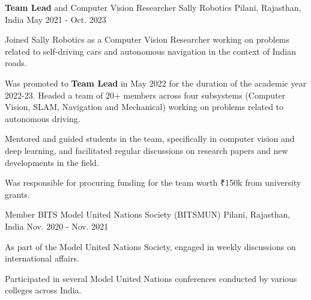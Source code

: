 

\begin{cventries}

  \cventry
    {\textbf{Team Lead} and Computer Vision Researcher} %
    {Sally Robotics} %
    {Pilani, Rajasthan, India} %
    {May 2021 - Oct. 2023} %
    {
      \begin{cvitems} %
        \item {Joined Sally Robotics as a Computer Vision Researcher working on
        problems related to self-driving cars and autonomous navigation in the
        context of Indian roads.}
        \item {Was promoted to \textbf{Team Lead} in May 2022 for the duration of the
        academic year 2022-23. Headed a team of 20+ members across four subsystems
        (Computer Vision, SLAM, Navigation and Mechanical) working on problems
        related to autonomous driving.}
        \item {Mentored and guided students in the team, specifically in computer
        vision and deep learning, and facilitated regular discussions on research
        papers and new developments in the field.}
        \item{Was responsible for procuring funding for the team worth ₹150k from
        university grants.}
      \end{cvitems}
    }

  \cventry
    {Member} %
    {BITS Model United Nations Society (BITSMUN)} %
    {Pilani, Rajasthan, India} %
    {Nov. 2020 - Nov. 2021} %
    {
      \begin{cvitems} %
        \item {As part of the Model United Nations Society, engaged in weekly discussions 
        on international affairs.}
        \item {Participated in several Model United Nations conferences conducted by
        various colleges across India.}
      \end{cvitems}
    }


\end{cventries}
